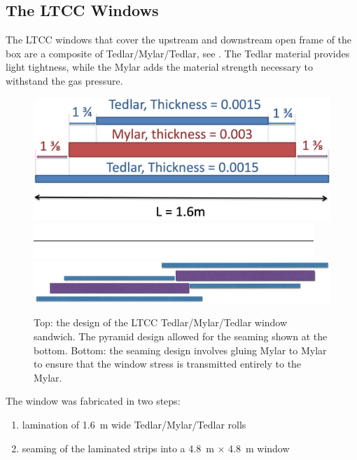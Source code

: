 \subsection{The LTCC Windows}

The LTCC windows that cover the upstream and downstream open frame of the box are a composite of
Tedlar/Mylar/Tedlar, see . The Tedlar material provides light tightness, while the Mylar adds the
material strength necessary to withstand the gas pressure.

\begin{figure}[!ht]
	\centering
	\includegraphics[width=0.98\columnwidth, keepaspectratio]{img/windowDesign.png}
	\includegraphics[width=0.98\columnwidth, height=0.1\columnwidth]{img/blank.png}
	\includegraphics[width=0.98\columnwidth, keepaspectratio]{img/windowSeaming.png}
	\caption{Top: the design of the LTCC Tedlar/Mylar/Tedlar window sandwich. The pyramid design allowed for the
          seaming shown at the bottom. Bottom: the seaming design involves gluing Mylar to Mylar to ensure that the window
          stress is transmitted entirely to the Mylar.}
	\label{fig:windowDesign}
\end{figure}


The window was fabricated in two steps:

\begin{enumerate}
	\item lamination of 1.6~m wide Tedlar/Mylar/Tedlar rolls
	\item seaming of the laminated strips into a 4.8~m $\times$ 4.8~m window
\end{enumerate}

